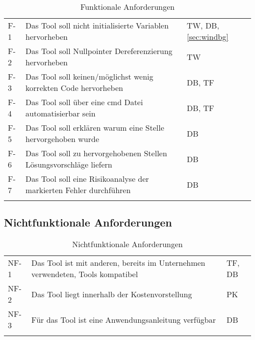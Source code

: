 \begin{longtable}{lL{10cm}l}
            \toprule
              & 
             & 
                          \\
            \midrule
            \endhead
            F-1 & 
            Das Tool soll nicht initialisierte Variablen hervorheben       & 
            TW, DB, \ref{sec:windbg} \\
            \midrule
            F-2 & 
            Das Tool soll Nullpointer Dereferenzierung hervorheben     & 
            TW                       \\
            \midrule
            F-3 & 
            Das Tool soll keinen/möglichst wenig korrekten Code hervorheben      & 
            DB, TF                   \\
            \midrule
            F-4 & 
            Das Tool soll über eine cmd Datei automatisierbar sein & 
            DB, TF                   \\
            \midrule
            F-5 & 
            Das Tool soll erklären warum eine Stelle hervorgehoben wurde & 
            DB                       \\
            \midrule
            F-6 & 
            Das Tool soll zu hervorgehobenen Stellen Lösungsvorschläge liefern & 
            DB                       \\
            \midrule
            F-7 & 
            Das Tool soll eine Risikoanalyse der markierten Fehler durchführen& 
            DB                       \\
            \bottomrule
    \caption{Funktionale Anforderungen}
    \label{tab:funktional}
\end{longtable}

\subsection{Nichtfunktionale Anforderungen}
\label{subsec:nichtfunktional}

\begin{longtable}{lL{10cm}l}
    \toprule
      & 
     & 
                  \\
    \midrule
    \endhead
    NF-1 & Das Tool ist mit anderen, bereits im Unternehmen verwendeten, Tools kompatibel & TF, DB      \\
    \midrule
    NF-2 & Das Tool liegt innerhalb der Kostenvorstellung                                 & PK          \\
    \midrule
    NF-3 & Für das Tool ist eine Anwendungsanleitung verfügbar                            & DB          \\
    \bottomrule
    \caption{Nichtfunktionale Anforderungen}
    \label{tab:nichtfunktional}
\end{longtable}